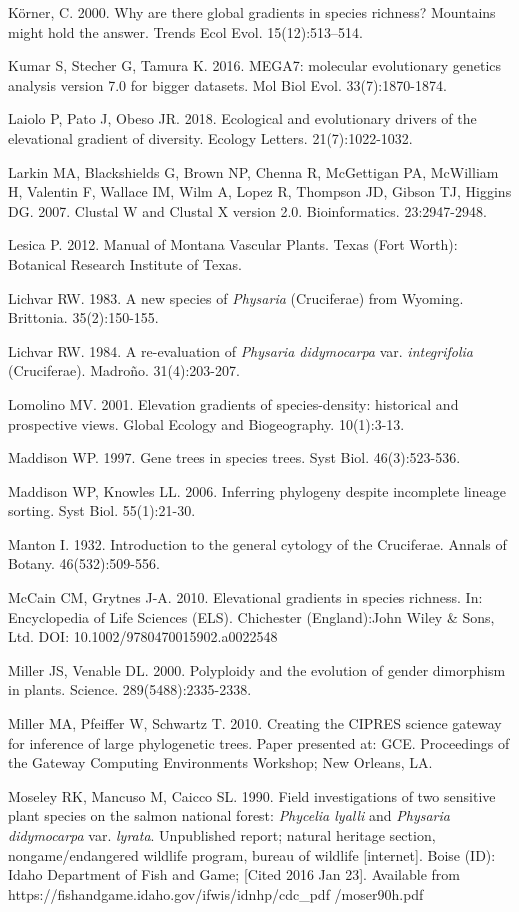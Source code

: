 Körner, C. 2000. Why are there global gradients in species richness? Mountains might hold the answer. Trends Ecol Evol. 15(12):513–514.

Kumar S, Stecher G, Tamura K. 2016. MEGA7: molecular evolutionary genetics analysis version 7.0 for bigger datasets. Mol Biol Evol. 33(7):1870-1874.

Laiolo P, Pato J, Obeso JR. 2018. Ecological and evolutionary drivers of the elevational gradient of diversity. Ecology Letters. 21(7):1022-1032.

Larkin MA, Blackshields G, Brown NP, Chenna R, McGettigan PA, McWilliam H, Valentin F, Wallace IM, Wilm A, Lopez R, Thompson JD, Gibson TJ, Higgins DG. 2007. Clustal W and Clustal X version 2.0. Bioinformatics. 23:2947-2948. 

Lesica P. 2012. Manual of Montana Vascular Plants. Texas (Fort Worth): Botanical Research Institute of Texas.

Lichvar RW. 1983. A new species of \textit{Physaria} (Cruciferae) from Wyoming.  Brittonia. 35(2):150-155.

Lichvar RW. 1984. A re-evaluation of \textit{Physaria didymocarpa} var. \textit{integrifolia} (Cruciferae). Madroño. 31(4):203-207.

Lomolino MV. 2001. Elevation gradients of species-density: historical and prospective views. Global Ecology and Biogeography. 10(1):3-13.

Maddison WP. 1997. Gene trees in species trees. Syst Biol. 46(3):523-536.

Maddison WP, Knowles LL. 2006. Inferring phylogeny despite incomplete lineage sorting. Syst Biol. 55(1):21-30.

Manton I. 1932. Introduction to the general cytology of the Cruciferae. Annals of Botany. 46(532):509-556.

McCain CM, Grytnes J-A. 2010. Elevational gradients in species richness. In: Encyclopedia of Life Sciences (ELS). Chichester (England):John Wiley \& Sons, Ltd.  DOI: 10.1002/9780470015902.a0022548

Miller JS, Venable DL. 2000. Polyploidy and the evolution of gender dimorphism in plants. Science. 289(5488):2335-2338.

Miller MA, Pfeiffer W, Schwartz T. 2010. Creating the CIPRES science gateway for inference of large phylogenetic trees. Paper presented at: GCE. Proceedings of the Gateway Computing Environments Workshop; New Orleans, LA.

Moseley RK, Mancuso M, Caicco SL. 1990. Field investigations of two sensitive plant species on the salmon national forest: \textit{Phycelia lyalli} and \textit{Physaria didymocarpa} var. \textit{lyrata}. Unpublished report; natural heritage section, nongame/endangered wildlife program, bureau of wildlife [internet]. Boise (ID): Idaho Department of Fish and Game; [Cited 2016 Jan 23]. Available from https://fishandgame.idaho.gov/ifwis/idnhp/cdc\_pdf /moser90h.pdf

